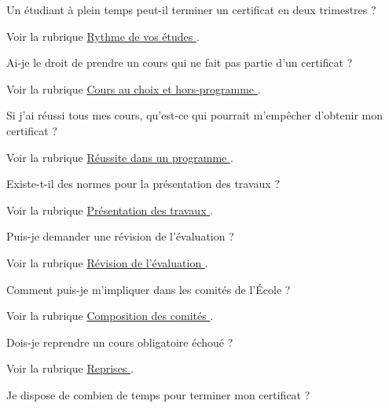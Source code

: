\documentclass [12 pt]{article}
\begin{document}
            Un étudiant à plein temps peut-il terminer un certificat en deux trimestres ?
            
                Voir la rubrique 
        \href{
        https://wiki.umontreal.ca/pages/viewpage.action?pageId=124097697#rythme
        } {
        Rythme de vos études
        }
    .
            
            Ai-je le droit de prendre un cours qui ne fait pas partie d'un certificat ?
            
                Voir la rubrique 
        \href{
        https://wiki.umontreal.ca/pages/viewpage.action?pageId=124097697#cours-choix-hp
        } {
        Cours au choix et hors-programme
        }
    .
            
            Si j'ai réussi tous mes cours, qu'est-ce qui pourrait m'empêcher d'obtenir mon
                certificat ?
            
                Voir la rubrique 
        \href{
        https://wiki.umontreal.ca/pages/viewpage.action?pageId=124097980#réussite-programme
        } {
        Réussite dans un programme
        }
    .
            
            Existe-t-il des normes pour la présentation des travaux ?
            
                Voir la rubrique 
        \href{
        /pages/viewpage.action?pageId=124097350
        } {
        Présentation
                        des travaux
        }
    .
            
            Puis-je demander une révision de l'évaluation ?
            
                Voir la rubrique 
        \href{
        /pages/viewpage.action?pageId=124097990
        } {
        Révision de
                        l'évaluation
        }
    .
            
            Comment puis-je m'impliquer dans les comités de l'École ?
            
                Voir la rubrique 
        \href{
        /pages/viewpage.action?pageId=124095459
        } {
        Composition
                        des comités
        }
    .
            
            Dois-je reprendre un cours obligatoire échoué ?
            
                Voir la rubrique 
        \href{
        /pages/viewpage.action?pageId=124097996
        } {
        Reprises
        }
    .
            
            Je dispose de combien de temps pour terminer mon certificat ?
            
\end{document}
